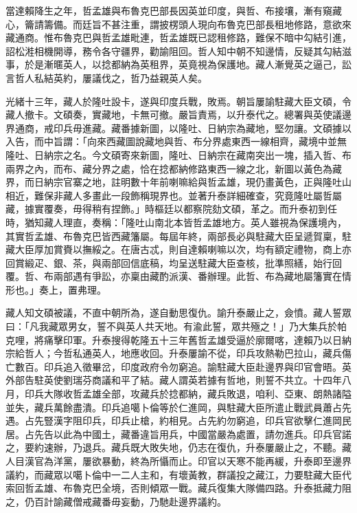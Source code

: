 \begin{pinyinscope}
當達賴降生之年，哲孟雄與布魯克巴部長因英並印度，與哲、布接壤，漸有窺藏心，籥請籌備。而廷旨不甚注重，謂披楞頭人現向布魯克巴部長租地修路，意欲來藏通商。惟布魯克巴與哲孟雄毗連，哲孟雄既已認租修路，難保不暗中勾結引進，詔松溎相機開導，務令各守疆界，勸諭阻回。哲人知中朝不知邊情，反疑其勾結滋事，於是漸暱英人，以捻都納為英租界，英竟視為保護地。藏人漸覺英之逼己，訟言哲人私結英約，屢議伐之，哲乃益親英人矣。

光緒十三年，藏人於隆吐設卡，遂與印度兵戰，敗焉。朝旨屢諭駐藏大臣文碩，令藏人撤卡。文碩奏，實藏地，卡無可撤。嚴旨責焉，以升泰代之。總署與英使議邊界通商，戒印兵毋進藏。藏番據新圖，以隆吐、日納宗為藏地，堅勿讓。文碩據以入告，而中旨謂：「向來西藏圖說藏地與哲、布分界處東西一線相齊，藏境中並無隆吐、日納宗之名。今文碩寄來新圖，隆吐、日納宗在藏南突出一塊，插入哲、布兩界之內，而布、藏分界之處，恰在捻都納修路東西一線之北，新圖以黃色為藏界，而日納宗官寨之地，註明數十年前喇嘛給與哲孟雄，現仍畫黃色，正與隆吐山相近，難保非藏人多畫此一段飾稱現界也。並著升泰詳細確查，究竟隆吐屬哲屬藏，據實覆奏，毋得稍有捏飾。」時樞廷以都察院劾文碩，革之。而升泰初到任時，猶知藏人理直，奏稱：「隆吐山南北本皆哲孟雄地方。英人雖視為保護境內，其實哲孟雄、布魯克巴皆西藏籓屬。每屆年終，兩部長必與駐藏大臣呈遞賀稟，駐藏大臣厚加賞賚以撫綏之。在唐古忒，則自達賴喇嘛以次，均有額定禮物，商上亦回賞緞疋、銀、茶，與兩部回信底稿，均呈送駐藏大臣查核，批準照繕，始行回覆。哲、布兩部遇有爭訟，亦稟由藏酌派漢、番辦理。此哲、布為藏地屬籓實在情形也。」奏上，置弗理。

藏人知文碩被議，不直中朝所為，遂自動思復仇。諭升泰嚴止之，僉憤。藏人誓眾曰：「凡我藏眾男女，誓不與英人共天地。有渝此誓，眾共殛之！」乃大集兵於帕克哩，將痛擊印軍。升泰搜得乾隆五十三年舊哲孟雄受逼於廓爾喀，達賴乃以日納宗給哲人；今哲私通英人，地應收回。升泰屢諭不從，印兵攻熱勒巴拉山，藏兵傷亡數百。印兵追入徵畢岔，印度政府令勿窮追。諭駐藏大臣赴邊界與印官會晤。英外部告駐英使劉瑞芬商議和平了結。藏人謂英若據有哲地，則誓不共立。十四年八月，印兵大隊收哲孟雄全部，攻藏兵於捻都納，藏兵敗退，咱利、亞東、朗熱諸隘並失，藏兵萬餘盡潰。印兵追噶卜倫等於仁進岡，與駐藏大臣所遣止戰武員蕭占先遇。占先豎漢字阻印兵，印兵止槍，約相見。占先約勿窮追，印兵官欲擊仁進岡民居。占先告以此為中國土，藏番違旨用兵，中國當嚴為處置，請勿進兵。印兵官諾之，要約速辦，乃退兵。藏兵既大敗失地，仍志在復仇，升泰屢嚴止之，不聽。藏人目漢官為洋黨，屢欲暴動，終為所懾而止。印官以天寒不能再緩，升泰即至邊界議約，而藏眾以噶卜倫中一二人主和，有壞黃教，群議投之藏江，力要駐藏大臣代索回哲孟雄、布魯克巴全境，否則傾眾一戰。藏兵復集大隊備四路。升泰抵藏力阻之，仍百計諭藏僧戒藏番毋妄動，乃馳赴邊界議約。


\end{pinyinscope}
